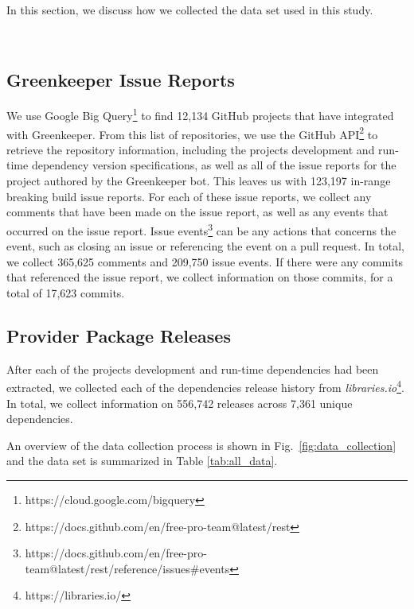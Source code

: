 In this section, we discuss how we collected the data set used in this study.

\par
~\subsection{Greenkeeper Issue Reports}\label{sec.data.issue_reports}
We use Google Big Query\footnote{https://cloud.google.com/bigquery} to find 12,134 GitHub projects that have integrated with Greenkeeper. From this list of repositories, we use the GitHub API\footnote{https://docs.github.com/en/free-pro-team@latest/rest} to retrieve the repository information, including the projects development and run-time dependency version specifications, as well as all of the issue reports for the project authored by the Greenkeeper bot. This leaves us with 123,197 in-range breaking build issue reports. For each of these issue reports, we collect any comments that have been made on the issue report, as well as any events that occurred on the issue report. Issue events\footnote{https://docs.github.com/en/free-pro-team@latest/rest/reference/issues\#events} can be any actions that concerns the event, such as closing an issue or referencing the event on a pull request. In total, we collect 365,625 comments and 209,750 issue events. If there were any commits that referenced the issue report, we collect information on those commits, for a total of 17,623 commits.
~\subsection{Provider Package Releases}\label{sec.data.provider_releases}
After each of the projects development and run-time dependencies had been extracted, we collected each of the dependencies release history from \textit{libraries.io}\footnote{https://libraries.io/}. In total, we collect information on 556,742 releases across 7,361 unique dependencies.
\par
An overview of the data collection process is shown in Fig.~\ref{fig:data_collection} and the data set is summarized in Table \ref{tab:all_data}.


